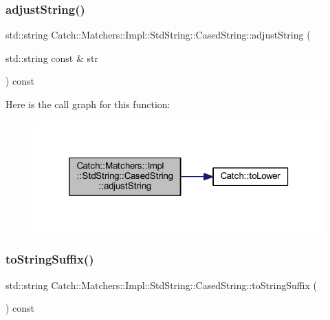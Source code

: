 \subsubsection{\texorpdfstring{adjust\+String()}{adjustString()}}
{\footnotesize\ttfamily std\+::string Catch\+::\+Matchers\+::\+Impl\+::\+Std\+String\+::\+Cased\+String\+::adjust\+String (\begin{DoxyParamCaption}\item[{std\+::string const \&}]{str }\end{DoxyParamCaption}) const\hspace{0.3cm}{\ttfamily [inline]}}

Here is the call graph for this function\+:\nopagebreak
\begin{figure}[H]
\begin{center}
\leavevmode
\includegraphics[width=320pt]{struct_catch_1_1_matchers_1_1_impl_1_1_std_string_1_1_cased_string_a8117fdcee8fd8a8e5001b38e0bd19848_cgraph}
\end{center}
\end{figure}
\hypertarget{struct_catch_1_1_matchers_1_1_impl_1_1_std_string_1_1_cased_string_ac12f719f5d1aeb28a2bc2f6cc8b95b37}{}\label{struct_catch_1_1_matchers_1_1_impl_1_1_std_string_1_1_cased_string_ac12f719f5d1aeb28a2bc2f6cc8b95b37} 
\subsubsection{\texorpdfstring{to\+String\+Suffix()}{toStringSuffix()}}
{\footnotesize\ttfamily std\+::string Catch\+::\+Matchers\+::\+Impl\+::\+Std\+String\+::\+Cased\+String\+::to\+String\+Suffix (\begin{DoxyParamCaption}{ }\end{DoxyParamCaption}) const\hspace{0.3cm}{\ttfamily [inline]}}



